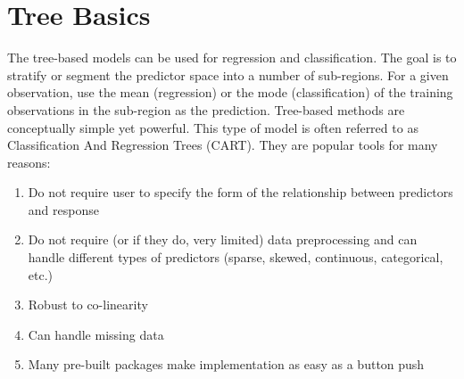 \documentclass[12pt,]{krantz}
\makeatletter
\newenvironment{Shaded}{\begin{snugshade}}{\end{snugshade}}
\newcommand{\CommentTok}[1]{\textcolor[rgb]{0.37,0.37,0.37}{\textit{#1}}}
\newcommand{\ControlFlowTok}[1]{\textcolor[rgb]{0.27,0.27,0.27}{\textbf{#1}}}
\newcommand{\DataTypeTok}[1]{\textcolor[rgb]{0.27,0.27,0.27}{#1}}
\newcommand{\DecValTok}[1]{\textcolor[rgb]{0.06,0.06,0.06}{#1}}
\newcommand{\KeywordTok}[1]{\textcolor[rgb]{0.27,0.27,0.27}{\textbf{#1}}}
\newcommand{\NormalTok}[1]{#1}
\newcommand{\OperatorTok}[1]{\textcolor[rgb]{0.43,0.43,0.43}{\textbf{#1}}}
\newcommand{\OtherTok}[1]{\textcolor[rgb]{0.37,0.37,0.37}{#1}}
\newcommand{\StringTok}[1]{\textcolor[rgb]{0.5,0.5,0.5}{#1}}
\providecommand{\tightlist}{%
  \setlength{\itemsep}{0pt}\setlength{\parskip}{0pt}}
\newenvironment{kframe}{%
\medskip{}
\setlength{\fboxsep}{.8em}
 \def\at@end@of@kframe{}%
 \ifinner\ifhmode%
  \def\at@end@of@kframe{\end{minipage}}%
  \begin{minipage}{\columnwidth}%
 \fi\fi%
 \def\FrameCommand##1{\hskip\@totalleftmargin \hskip-\fboxsep
 \colorbox{shadecolor}{##1}\hskip-\fboxsep
     \hskip-\linewidth \hskip-\@totalleftmargin \hskip\columnwidth}%
 \MakeFramed {\advance\hsize-\width
   \@totalleftmargin\z@ \linewidth\hsize
   \@setminipage}}%
 {\par\unskip\endMakeFramed%
 \at@end@of@kframe}
\renewenvironment{Shaded}{\begin{kframe}}{\end{kframe}}
\makeatother
\begin{document}
\begin{Shaded}
\end{Shaded}

\hypertarget{tree-basics}{%
\section{Tree Basics}\label{tree-basics}}

The tree-based models can be used for regression and classification. The goal is to stratify or segment the predictor space into a number of sub-regions. For a given observation, use the mean (regression) or the mode (classification) of the training observations in the sub-region as the prediction. Tree-based methods are conceptually simple yet powerful. This type of model is often referred to as Classification And Regression Trees (CART). They are popular tools for many reasons:

\begin{enumerate}
\def\labelenumi{\arabic{enumi}.}
\tightlist
\item
  Do not require user to specify the form of the relationship between predictors and response
\item
  Do not require (or if they do, very limited) data preprocessing and can handle different types of predictors (sparse, skewed, continuous, categorical, etc.)
\item
  Robust to co-linearity
\item
  Can handle missing data
\item
  Many pre-built packages make implementation as easy as a button push
\end{enumerate}
\end{document}
